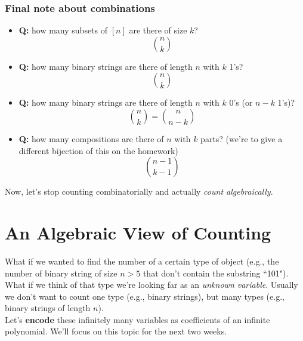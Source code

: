 \documentclass{report}
\begin{document}
\subsubsection{Final note about combinations}
\begin{itemize}
\item \textbf{Q:} how many subsets of $[n]$ are there of size $k$?
$$n \choose k$$
\item \textbf{Q:} how many binary strings are there of length $n$ with $k$ 1's?
$$n \choose k$$
\item \textbf{Q:} how many binary strings are there of length $n$ with $k$ 0's (or $n-k$ 1's)?
$${n \choose k} = {n \choose n-k}$$
\item \textbf{Q:} how many compositions are there of $n$ with $k$ parts? (we're to give a different bijection of this on the homework)
$${n-1 \choose k-1}$$
\end{itemize}
Now, let's stop counting combinatorially and actually \textit{count algebraically}.
\section{An Algebraic View of Counting}
What if we wanted to find the number of a certain type of object (e.g., the number of binary string of size $n > 5$ that don't contain the substring ``101").\\What if we think of that type we're looking far as an \textit{unknown variable}. Usually we don't want to count one type (e.g., binary strings), but many types (e.g., binary strings of length $n$).\\
Let's \textbf{encode} these infinitely many variables as coefficients of an infinite polynomial. We'll focus on this topic for the next two weeks.
\end{document}
